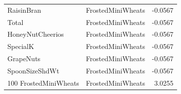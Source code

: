 \begin{longtable}{llr}
RaisinBran & FrostedMiniWheats & -0.0567 \\
Total & FrostedMiniWheats & -0.0567 \\
HoneyNutCheerios & FrostedMiniWheats & -0.0567 \\
SpecialK & FrostedMiniWheats & -0.0567 \\
GrapeNuts & FrostedMiniWheats & -0.0567 \\
SpoonSizeShdWt & FrostedMiniWheats & -0.0567 \\
100%
FrostedMiniWheats & FrostedMiniWheats & 3.0255 \\
\end{longtable}

